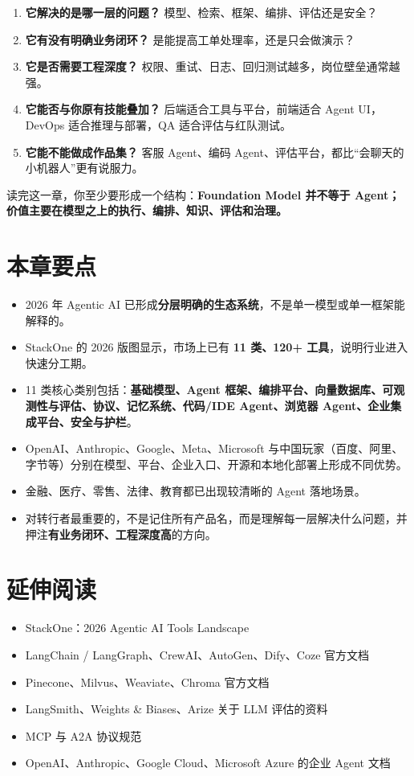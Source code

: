 \begin{enumerate}[leftmargin=2em]
\item \textbf{它解决的是哪一层的问题？} 模型、检索、框架、编排、评估还是安全？
\item \textbf{它有没有明确业务闭环？} 是能提高工单处理率，还是只会做演示？
\item \textbf{它是否需要工程深度？} 权限、重试、日志、回归测试越多，岗位壁垒通常越强。
\item \textbf{它能否与你原有技能叠加？} 后端适合工具与平台，前端适合 Agent UI，DevOps 适合推理与部署，QA 适合评估与红队测试。
\item \textbf{它能不能做成作品集？} 客服 Agent、编码 Agent、评估平台，都比``会聊天的小机器人''更有说服力。
\end{enumerate}

读完这一章，你至少要形成一个结构：\textbf{Foundation Model 并不等于 Agent；价值主要在模型之上的执行、编排、知识、评估和治理。}


\section{本章要点}

\begin{itemize}[leftmargin=2em]
\item 2026 年 Agentic AI 已形成\textbf{分层明确的生态系统}，不是单一模型或单一框架能解释的。
\item StackOne 的 2026 版图显示，市场上已有 \textbf{11 类、120+ 工具}，说明行业进入快速分工期。
\item 11 类核心类别包括：\textbf{基础模型、Agent 框架、编排平台、向量数据库、可观测性与评估、协议、记忆系统、代码/IDE Agent、浏览器 Agent、企业集成平台、安全与护栏}。
\item OpenAI、Anthropic、Google、Meta、Microsoft 与中国玩家（百度、阿里、字节等）分别在模型、平台、企业入口、开源和本地化部署上形成不同优势。
\item 金融、医疗、零售、法律、教育都已出现较清晰的 Agent 落地场景。
\item 对转行者最重要的，不是记住所有产品名，而是理解每一层解决什么问题，并押注\textbf{有业务闭环、工程深度高}的方向。
\end{itemize}

\section{延伸阅读}

\begin{itemize}[leftmargin=2em]
\item StackOne：2026 Agentic AI Tools Landscape
\item LangChain / LangGraph、CrewAI、AutoGen、Dify、Coze 官方文档
\item Pinecone、Milvus、Weaviate、Chroma 官方文档
\item LangSmith、Weights \& Biases、Arize 关于 LLM 评估的资料
\item MCP 与 A2A 协议规范
\item OpenAI、Anthropic、Google Cloud、Microsoft Azure 的企业 Agent 文档
\end{itemize}
